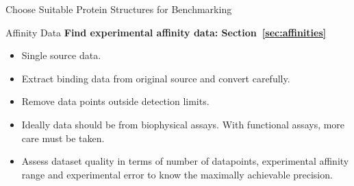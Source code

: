 \documentclass[9pt,bestpractices]{livecoms}
\begin{document}
\begin{Checklists*}
\begin{checklist}{Choose Suitable Protein Structures for Benchmarking}
\end{checklist}

\begin{checklist}{Affinity Data}
\textbf{Find experimental affinity data: Section~\ref{sec:affinities}}
    \begin{itemize}
    \item Single source data.
    \item Extract binding data from original source and convert carefully.
    \item Remove data points outside detection limits.
    \item Ideally data should be from biophysical assays. With functional assays, more care must be taken.
    \item Assess dataset quality in terms of number of datapoints, experimental affinity range and experimental error to know the maximally achievable precision.
    \end{itemize}
\end{checklist}

\end{Checklists*}
\end{document}
